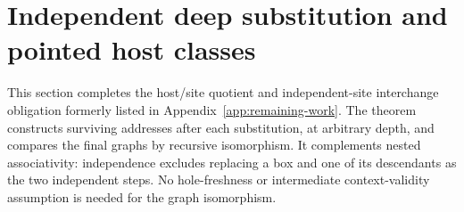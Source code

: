 \section{Independent deep substitution and pointed host classes}
\label{sec:deep-interchange}
This section completes the host/site quotient and independent-site
interchange obligation formerly listed in Appendix~\ref{app:remaining-work}.
The theorem constructs surviving addresses after each substitution, at
arbitrary depth, and compares the final graphs by recursive isomorphism.
It complements nested associativity: independence excludes replacing a
box and one of its descendants as the two independent steps.
No hole-freshness or intermediate context-validity assumption is needed
for the graph isomorphism.

